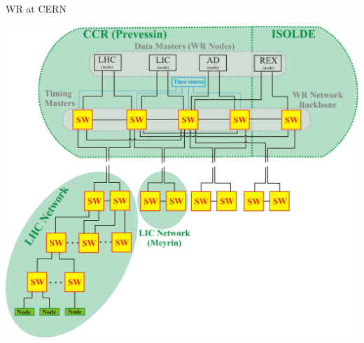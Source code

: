 \documentclass[compress,red]{beamer}
\begin{document}
\begin{frame}{WR at CERN}

    \begin{center}
      \includegraphics[width=.8\textwidth]{applications/CERN/NT-overview.pdf}
    \end{center}

\end{frame}
\end{document}

